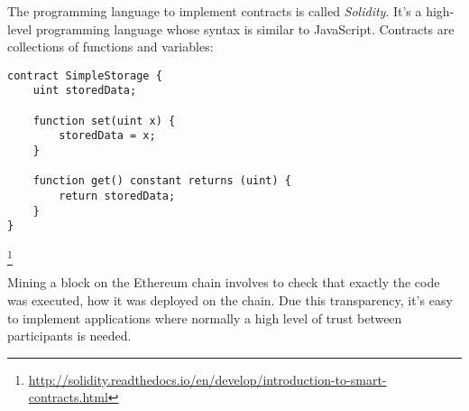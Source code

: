 The programming language to implement contracts is called \textit{Solidity}. It's a high-level programming language whose syntax is similar to JavaScript. Contracts are collections of functions and variables:

\begin{lstlisting}
contract SimpleStorage {
    uint storedData;

    function set(uint x) {
        storedData = x;
    }

    function get() constant returns (uint) {
        return storedData;
    }
}
\end{lstlisting}\footnote{\url{http://solidity.readthedocs.io/en/develop/introduction-to-smart-contracts.html}}


Mining a block on the Ethereum chain involves to check that exactly the code was executed, how it was deployed on the chain. Due this transparency, it's easy to implement applications where normally a high level of trust between participants is needed.